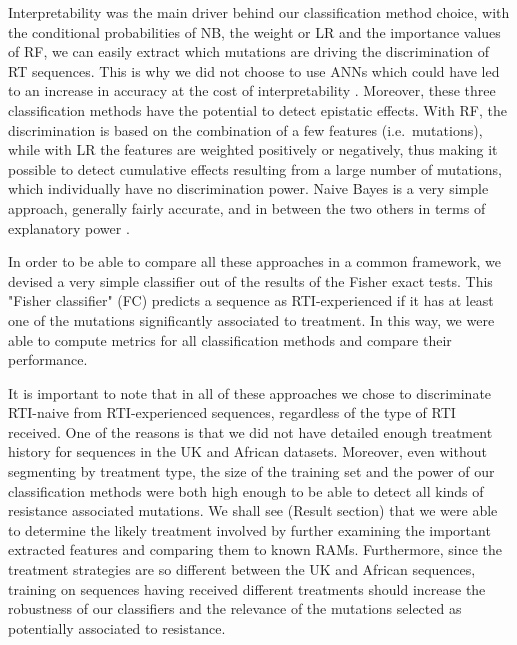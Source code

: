 \documentclass[
  11pt,
  twoside,
  BCOR=10mm,
  listof=totoc]{scrbook}
\begin{document}
Interpretability was the main driver behind our classification method
choice, with the conditional probabilities of NB, the weight or LR and
the importance values of RF, we can easily extract which mutations are
driving the discrimination of RT sequences. This is why we did not
choose to use ANNs which could have led to an increase in accuracy at
the cost of interpretability
\autocite{alvarezmelisRobustInterpretabilitySelfExplaining2018,hastieElementsStatisticalLearning2009,zhangInterpretableConvolutionalNeural2018}.
Moreover, these three classification methods have the potential to
detect epistatic effects. With RF, the discrimination is based on the
combination of a few features (i.e.~mutations), while with LR the
features are weighted positively or negatively, thus making it possible
to detect cumulative effects resulting from a large number of mutations,
which individually have no discrimination power. Naive Bayes is a very
simple approach, generally fairly accurate, and in between the two
others in terms of explanatory power
\autocite{gascuelTwelveNumericalSymbolic1998}.

In order to be able to compare all these approaches in a common
framework, we devised a very simple classifier out of the results of the
Fisher exact tests. This "Fisher classifier" (FC) predicts a sequence
as RTI-experienced if it has at least one of the mutations significantly
associated to treatment. In this way, we were able to compute metrics
for all classification methods and compare their performance.

It is important to note that in all of these approaches we chose to
discriminate RTI-naive from RTI-experienced sequences, regardless of the
type of RTI received. One of the reasons is that we did not have
detailed enough treatment history for sequences in the UK and African
datasets. Moreover, even without segmenting by treatment type, the size
of the training set and the power of our classification methods were
both high enough to be able to detect all kinds of resistance associated
mutations. We shall see (Result section) that we were able to determine
the likely treatment involved by further examining the important
extracted features and comparing them to known RAMs. Furthermore, since
the treatment strategies are so different between the UK and African
sequences, training on sequences having received different treatments
should increase the robustness of our classifiers and the relevance of
the mutations selected as potentially associated to resistance.
\end{document}
